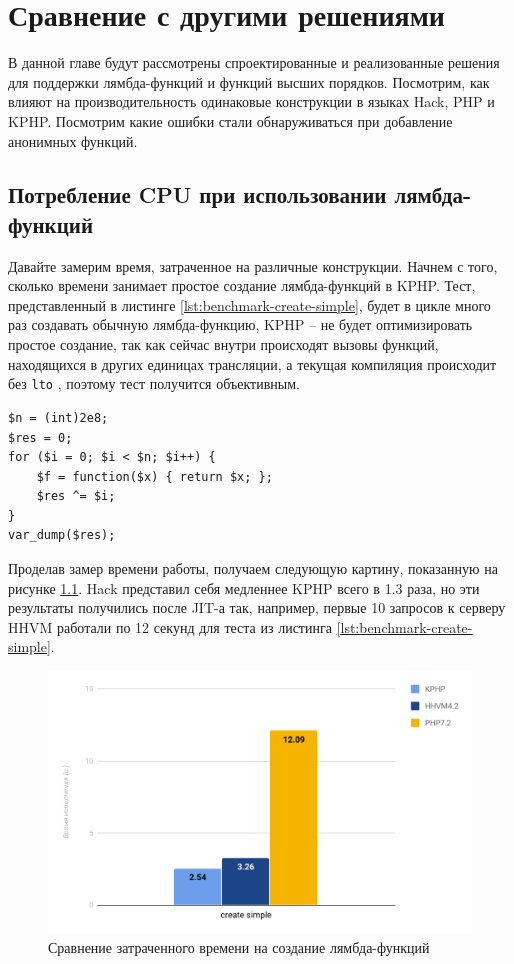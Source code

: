 
\chapter{Сравнение с другими решениями}
\label{sec:comparision}
В данной главе будут рассмотрены спроектированные и реализованные решения для поддержки лямбда-функций и функций высших порядков.
Посмотрим, как влияют на производительность одинаковые конструкции в языках Hack, PHP и KPHP.
Посмотрим какие ошибки стали обнаруживаться при добавление анонимных функций.

\section{Потребление CPU при использовании лямбда-функций}
Давайте замерим время, затраченное на различные конструкции.
Начнем с того, сколько времени занимает простое создание лямбда-функций в KPHP.
Тест, представленный в листинге \ref{lst:benchmark-create-simple}, будет в цикле много раз создавать обычную лямбда-функцию, KPHP -- не будет оптимизировать простое создание, так как сейчас внутри происходят вызовы функций, находящихся в других единицах трансляции, а текущая компиляция происходит без \verb|lto| \cite{lto}, поэтому тест получится объективным.
\begin{lstlisting}[caption={Бенчмарк создания анонимных функций},label={lst:benchmark-create-simple}]
$n = (int)2e8;
$res = 0;
for ($i = 0; $i < $n; $i++) {
    $f = function($x) { return $x; };
    $res ^= $i;
}
var_dump($res);
\end{lstlisting}

Проделав замер времени работы, получаем следующую картину, показанную на рисунке \ref{fig:benchmark-create-simple}.
Hack представил себя медленнее KPHP всего в 1.3 раза, но эти результаты получились после JIT-а так, например, первые 10 запросов к серверу HHVM работали по 12 секунд для теста из листинга \ref{lst:benchmark-create-simple}.
\begin{figure}[H]
    \caption{Сравнение затраченного времени на создание лямбда-функций}
    \label{fig:benchmark-create-simple}
    \centering
    \includegraphics[width=\linewidth]{images/benchmark_create_simple}
\end{figure}

